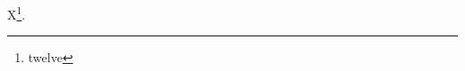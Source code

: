 \documentclass{llncs}
\begin{document}
\setcounter{footnote}{11}
X\footnote{twelve}.
\end{document}
